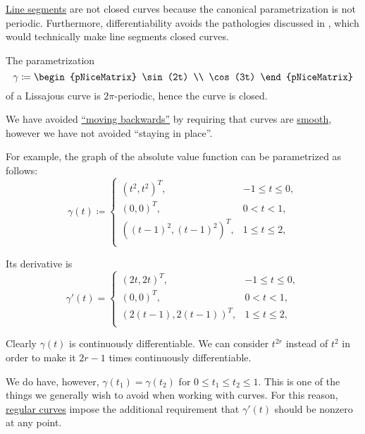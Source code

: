 \begin{example}\label{ex:def:closed_curve}
  \hfill
  \begin{thmenum}
     \hyperref[def:line_segment]{Line segments} are not closed curves because the canonical parametrization is not periodic. Furthermore, differentiability avoids the pathologies discussed in , which would technically make line segments closed curves.

     The parametrization
    \begin{equation*}
      \gamma \coloneqq \begin{pNiceMatrix} \sin(2t) \\ \cos(3t) \end{pNiceMatrix}
    \end{equation*}
    of a Lissajous curve is \( 2\pi \)-periodic, hence the curve is closed.
  \end{thmenum}
\end{example}

\begin{example}\label{ex:curve_staying_in_place}
  We have avoided \hyperref[ex:curve_moving_backwards]{\enquote{moving backwards}} by requiring that curves are \hyperref[def:smooth_curve]{smooth}, however we have not avoided \enquote{staying in place}.

  For example, the graph of the absolute value function can be parametrized as follows:
  \begin{equation*}
    \gamma(t) \coloneqq \begin{cases}
      ( t^2     , t^2 )^T,     &-1 \leq t \leq 0, \\
      ( 0       , 0 )^T,       &0 < t < 1, \\
      ( (t-1)^2 , (t-1)^2 )^T, &1 \leq t \leq 2, \\
    \end{cases}
  \end{equation*}

  Its derivative is
  \begin{equation*}
    \gamma'(t) = \begin{cases}
      ( 2t     , 2t )^T,     &-1 \leq t \leq 0, \\
      ( 0      , 0 )^T,      &0 < t < 1, \\
      ( 2(t-1) , 2(t-1) )^T, &1 \leq t \leq 2, \\
    \end{cases}
  \end{equation*}

  Clearly \( \gamma(t) \) is continuously differentiable. We can consider \( t^{2r} \) instead of \( t^2 \) in order to make it \( 2r - 1 \) times continuously differentiable.

  We do have, however, \( \gamma(t_1) = \gamma(t_2) \) for \( 0 \leq t_1 \leq t_2 \leq 1 \). This is one of the things we generally wish to avoid when working with curves. For this reason, \hyperref[def:regular_curve]{regular curves} impose the additional requirement that \( \gamma'(t) \) should be nonzero at any point.
\end{example}

